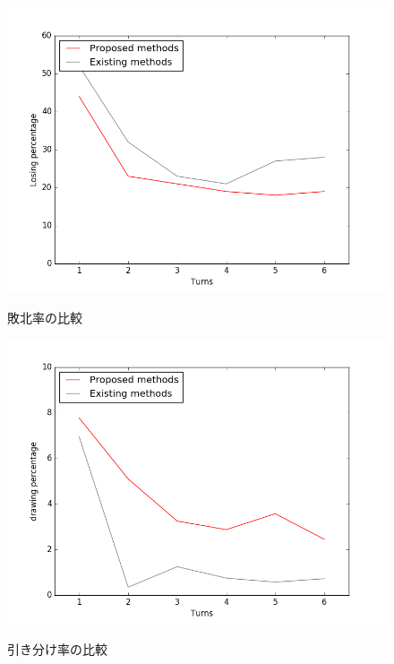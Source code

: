 \begin{figure}[]
\begin{center}
   \includegraphics[scale=0.8]{./koki/ll.png} \\
   \caption{敗北率の比較}
\end{center}
\label{fig:ll}
\end{figure}

\begin{figure}[]
\begin{center}
   \includegraphics[scale=0.8]{./koki/d.png} \\
   \caption{引き分け率の比較}
\end{center}
\label{fig:d}
\end{figure}

